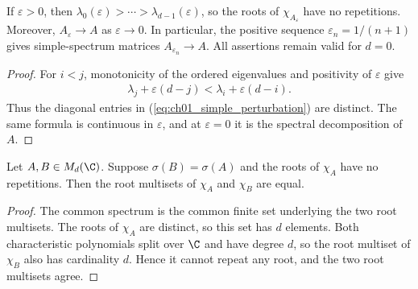 \begin{theorem}
    \label{thm:hermitian_simple_spectrum_perturbation}
    \leanok
    If $\varepsilon>0$, then
    $\lambda_0(\varepsilon)>\cdots>\lambda_{d-1}(\varepsilon)$, so the roots
    of $\chi_{A_\varepsilon}$ have no repetitions. Moreover,
    $A_\varepsilon\to A$ as $\varepsilon\to0$. In particular, the positive
    sequence $\varepsilon_n=1/(n+1)$ gives simple-spectrum matrices
    $A_{\varepsilon_n}\to A$. All assertions remain valid for $d=0$.
\end{theorem}

\begin{proof}\leanok
    For $i<j$, monotonicity of the ordered eigenvalues and positivity of
    $\varepsilon$ give
    \begin{align}
        \lambda_j+\varepsilon(d-j)
        <\lambda_i+\varepsilon(d-i).
    \end{align}
    Thus the diagonal entries in (\ref{eq:ch01_simple_perturbation}) are
    distinct. The same formula is continuous in $\varepsilon$, and at
    $\varepsilon=0$ it is the spectral decomposition of $A$.
\end{proof}

\begin{theorem}
    \label{thm:set_spectrum_multiplicity}
    \leanok
    Let $A,B\in M_d(\C)$. Suppose $\sigma(B)=\sigma(A)$ and the roots of
    $\chi_A$ have no repetitions. Then the root multisets of $\chi_A$ and
    $\chi_B$ are equal.
\end{theorem}

\begin{proof}\leanok
    The common spectrum is the common finite set underlying the two root
    multisets. The roots of $\chi_A$ are distinct, so this set has $d$
    elements. Both characteristic polynomials split over $\C$ and have degree
    $d$, so the root multiset of $\chi_B$ also has cardinality $d$. Hence it
    cannot repeat any root, and the two root multisets agree.
\end{proof}

